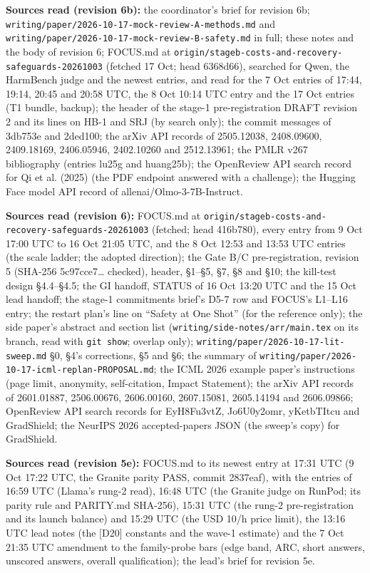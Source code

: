 \documentclass{article}
\theoremstyle{plain}
\theoremstyle{definition}
\theoremstyle{remark}
\begin{document}
\textbf{Sources read (revision 6b):} the coordinator's brief for revision 6b;
\nolinkurl{writing/paper/2026-10-17-mock-review-A-methods.md} and
\nolinkurl{writing/paper/2026-10-17-mock-review-B-safety.md} in full; these
notes and the body of revision 6; FOCUS.md at
\nolinkurl{origin/stageb-costs-and-recovery-safeguards-20261003} (fetched 17
Oct; head 6368d66), searched for Qwen, the HarmBench judge and the newest
entries, and read for the 7 Oct entries of 17:44, 19:14, 20:45 and 20:58 UTC,
the 8 Oct 10:14 UTC entry and the 17 Oct entries (T1 bundle, backup); the header
of the stage-1 pre-registration DRAFT revision 2 and its lines on HB-1 and SRJ
(by search only); the commit messages of 3db753e and 2ded100; the arXiv API
records of 2505.12038, 2408.09600, 2409.18169, 2406.05946, 2402.10260 and
2512.13961; the PMLR v267 bibliography (entries lu25g and huang25b); the
OpenReview API search record for Qi et al. (2025) (the PDF endpoint answered
with a challenge); the Hugging Face model API record of
allenai/Olmo-3-7B-Instruct.

\textbf{Sources read (revision 6):} FOCUS.md at
\nolinkurl{origin/stageb-costs-and-recovery-safeguards-20261003} (fetched; head
416b780), every entry from 9 Oct 17:00 UTC to 16 Oct 21:05 UTC, and the 8 Oct
12:53 and 13:53 UTC entries (the scale ladder; the adopted direction); the Gate
B/C pre-registration, revision 5 (SHA-256 5c97cce7\ldots{} checked), header,
\S{}1--\S{}5, \S{}7, \S{}8 and \S{}10; the kill-test design \S{}4.4--\S{}4.5;
the GI handoff, STATUS of 16 Oct 13:20 UTC and the 15 Oct lead handoff; the
stage-1 commitments brief's D5-7 row and FOCUS's L1--L16 entry; the restart
plan's line on ``Safety at One Shot'' (for the reference only); the side paper's
abstract and section list (\nolinkurl{writing/side-notes/arr/main.tex} on its
branch, read with \texttt{git show}; overlap only);
\nolinkurl{writing/paper/2026-10-17-lit-sweep.md} \S{}0, \S{}4's corrections,
\S{}5 and \S{}6; the summary of
\nolinkurl{writing/paper/2026-10-17-icml-replan-PROPOSAL.md}; the ICML 2026
example paper's instructions (page limit, anonymity, self-citation, Impact
Statement); the arXiv API records of 2601.01887, 2506.00676, 2606.00160,
2607.15081, 2605.14194 and 2606.09866; OpenReview API search records for
EyH8Fu3vtZ, Jo6U0y2omr, yKetbTItcu and GradShield; the NeurIPS 2026
accepted-papers JSON (the sweep's copy) for GradShield.

\textbf{Sources read (revision 5e):} FOCUS.md to its newest entry at 17:31 UTC
(9 Oct 17:22 UTC, the Granite parity PASS, commit 2837eaf), with the entries of
16:59 UTC (Llama's rung-2 read), 16:48 UTC (the Granite judge on RunPod; its
parity rule and PARITY.md SHA-256), 15:31 UTC (the rung-2 pre-registration and
its launch balance) and 15:29 UTC (the USD 10/h price limit), the 13:16 UTC lead
notes (the [D20] constants and the wave-1 estimate) and the 7 Oct 21:35 UTC
amendment to the family-probe bars (edge band, ARC, short answers, unscored
answers, overall qualification); the lead's brief for revision 5e.
\end{document}
